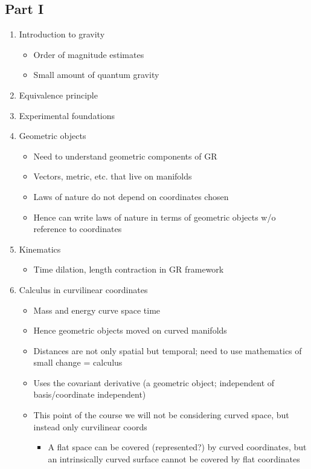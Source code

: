 \documentclass[a4paper]{article} %
\begin{document}
\subsection{Part I}
\begin{enumerate}
\item Introduction to gravity
\begin{itemize}
\item Order of magnitude estimates
\item Small amount of quantum gravity
\end{itemize}
\item Equivalence principle
\item Experimental foundations
\item Geometric objects
\begin{itemize}
\item Need to understand geometric components of GR
\item Vectors, metric, etc. that live on manifolds
\item Laws of nature do not depend on coordinates chosen
\item Hence can write laws of nature in terms of geometric objects w/o reference to coordinates
\end{itemize}
\item Kinematics
\begin{itemize}
\item Time dilation, length contraction in GR framework
\end{itemize}
\item Calculus in curvilinear coordinates
\begin{itemize}
\item Mass and energy curve space time
\item Hence geometric objects moved on curved manifolds
\item Distances are not only spatial but temporal; need to use mathematics of small change = calculus
\item Uses the covariant derivative (a geometric object; independent of basis/coordinate independent)
\item This point of the course we will not be considering curved space, but instead only curvilinear coords 
\begin{itemize}
\item A flat space can be covered (represented?) by curved coordinates, but an intrinsically curved surface cannot be covered by flat coordinates
\end{itemize}

\end{itemize}
\end{enumerate}
\end{document}
